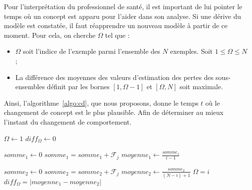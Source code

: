 Pour l'interprétation du professionnel de santé, il est important de lui pointer le temps où un concept est apparu pour l'aider dans son analyse.
Si une dérive du modèle est constatée, il faut réapprendre un nouveau modèle à partir de ce moment. Pour cela, on cherche $\Omega$ tel que :
\begin{itemize} 
\item $\Omega$ soit l'indice de l'exemple parmi l'ensemble des $N$ exemples. Soit $1 \leq \Omega \leq N$;
\item La différence des moyennes des valeurs d'estimation des pertes des sous-ensembles définit par les bornes $[1,\Omega-1]$ et $[\Omega,N]$ soit maximale.
\end{itemize}

Ainsi, l'algorithme~\ref{algo:cd}, que nous proposons, donne le temps $t$ où le changement de concept est le plus plausible. Afin de déterminer au mieux l'instant du changement de comportement.

\begin{algorithm}
\DontPrintSemicolon
{}
$\Omega \gets 1$\;
$diff_\Omega \gets 0$\;
 {
	$somme_1 \gets 0$\;
	 {
    	$somme_1 = somme_1+ \mathcal{F}_{j}$\;
    }
    $moyenne_1 \gets \frac{somme_1}{i-1}$\;
    
    $somme_2 \gets 0$\;
	 {
    	$somme_2 = somme_2+ \mathcal{F}_{j}$\;
    }
    $moyenne_2 \gets \frac{somme_2}{(N-i)+1}$\;
   {
    $\Omega = i$\;
    $diff_\Omega = |moyenne_1-moyenne_2|$\;
  }
}
\Retour{$\Omega$}\;
\caption{{}}
\label{algo:cd}
\end{algorithm}